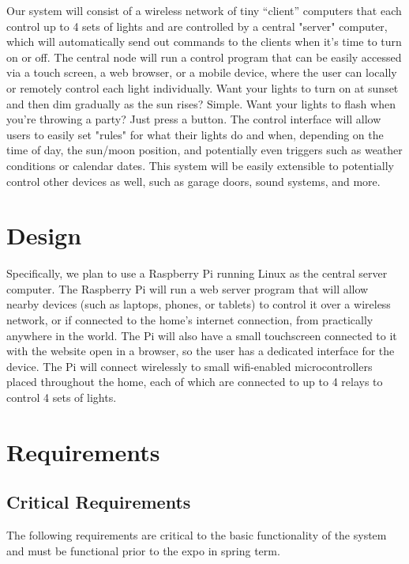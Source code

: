 \documentclass[12pt]{article}
\begin{document}
Our system will consist of a wireless network of tiny “client” computers that
each control up to 4 sets of lights and are controlled by a central "server"
computer, which will automatically send out commands to the clients when it's
time to turn on or off.  The central node will run a control program that can
be easily accessed via a touch screen, a web browser, or a mobile device, where
the user can locally or remotely control each light individually.  Want your
lights to turn on at sunset and then dim gradually as the sun rises?  Simple.
Want your lights to flash when you're throwing a party?  Just press a button.
The control interface will allow users to easily set "rules" for what their
lights do and when, depending on the time of day, the sun/moon position, and
potentially even triggers such as weather conditions or calendar dates.  This
system will be easily extensible to potentially control other devices as well,
such as garage doors, sound systems, and more.

\section{Design}

Specifically, we plan to use a Raspberry Pi running Linux as the central server
computer.  The Raspberry Pi will run a web server program that will allow
nearby devices (such as laptops, phones, or tablets) to control it over a
wireless network, or if connected to the home's internet connection, from
practically anywhere in the world.  The Pi will also have a small touchscreen
connected to it with the website open in a browser, so the user has a dedicated
interface for the device.  The Pi will connect wirelessly to small wifi-enabled
microcontrollers placed throughout the home, each of which are connected to up
to 4 relays to control 4 sets of lights.

\section{Requirements}

\subsection{Critical Requirements}

The following requirements are critical to the basic functionality of the
system and must be functional prior to the expo in spring term.
\end{document}
